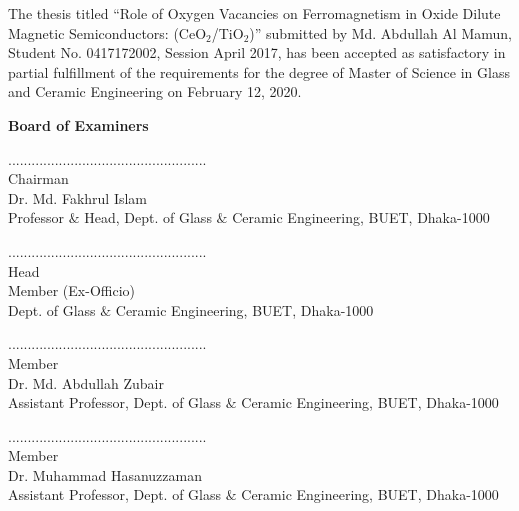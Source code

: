 \documentclass[main.tex]{subfiles}
\begin{document}
\noindent The thesis titled “Role of Oxygen Vacancies on Ferromagnetism in Oxide Dilute Magnetic Semiconductors: (CeO$_{2}$/TiO$_{2}$)” submitted by Md. Abdullah Al Mamun, Student No. 0417172002, Session April 2017, has been accepted as satisfactory in partial fulfillment of the requirements for the degree of Master of Science in Glass and Ceramic Engineering on February 12, 2020.\\



\centering

\vspace{1cm}

\textbf{\large{Board of Examiners}}

\vspace{1.8cm}

...................................................\\

Chairman\\ Dr. Md. Fakhrul Islam \\ Professor $\&$ Head, Dept. of Glass $\&$ Ceramic Engineering, BUET, Dhaka-1000\\

\vspace{1.8cm}

...................................................\\

Head\\ Member (Ex-Officio) \\ Dept. of Glass $\&$ Ceramic Engineering, BUET, Dhaka-1000\\

\vspace{1.8cm}

...................................................\\ 

Member\\ Dr. Md. Abdullah Zubair\\ Assistant Professor, Dept. of Glass $\&$ Ceramic Engineering, BUET, Dhaka-1000\\

\vspace{1.8cm}

...................................................\\ 

Member\\ Dr. Muhammad Hasanuzzaman\\ Assistant Professor, Dept. of Glass $\&$ Ceramic Engineering, BUET, Dhaka-1000\\
\end{document}
